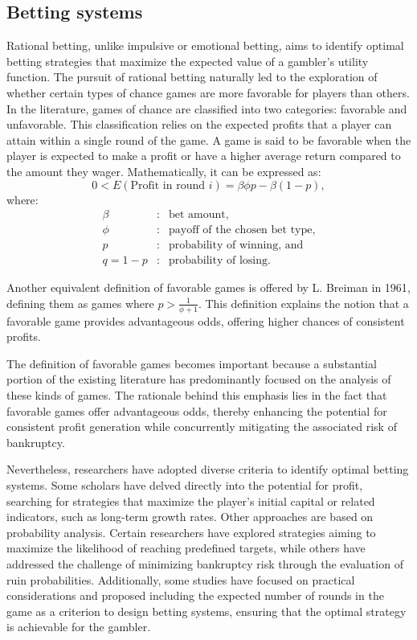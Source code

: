 \documentclass[11pt,twoside]{article}
\numberwithin{Theorem}{section}
\numberwithin{Definition}{section}
\numberwithin{Lemma}{section}
\numberwithin{Algorithm}{section}
\numberwithin{equation}{section}
\begin{document}
\subsection{Betting systems}
Rational betting, unlike impulsive or emotional betting, aims to identify optimal betting strategies that maximize the expected value of a gambler's utility function. The pursuit of rational betting naturally led to the exploration of whether certain types of chance games are more favorable for players than others. In the literature, games of chance are classified into two categories: favorable and unfavorable. This classification relies on the expected profits that a player can attain within a single round of the game. A game is said to be favorable when the player is expected to make a profit or have a higher average return compared to the amount they wager\cite{Dubins}. Mathematically, it can be expressed as:
\begin{equation}
0 < E(\text{Profit in round }i) = \beta\phi p -\beta(1-p),
\end{equation}\label{expectation_1}
where:
\begin{eqnarray*}
    \beta&:& \text{bet amount,}\\
    \phi&:& \text{payoff of the chosen bet type,}\\
    p&:& \text{probability of winning, and}\\
    q = 1-p &:&  \text{probability of losing}.
\end{eqnarray*}

Another equivalent definition of favorable games is offered by L. Breiman in 1961\cite{Breiman_1961}, defining them as games where $p > \frac{1}{\phi + 1}$. This definition explains the notion that a favorable game provides advantageous odds, offering higher chances of consistent profits.

The definition of favorable games becomes important because a substantial portion of the existing literature has predominantly focused on the analysis of these kinds of games\cite{Kelly, Breiman_1961, Dubins, Ethier_1982, Finkelstein_1981, Smith}. The rationale behind this emphasis lies in the fact that favorable games offer advantageous odds, thereby enhancing the potential for consistent profit generation while concurrently mitigating the associated risk of bankruptcy.

Nevertheless, researchers have adopted diverse criteria to identify optimal betting systems. Some scholars have delved directly into the potential for profit, searching for strategies that maximize the player's initial capital\cite{Thorp} or related indicators, such as long-term growth rates\cite{Kelly}. Other approaches are based on probability analysis. Certain researchers have explored strategies aiming to maximize the likelihood of reaching predefined targets\cite{Breiman_1961, Dubins, Ross_1974}, while others have addressed the challenge of minimizing bankruptcy risk through the evaluation of ruin probabilities\cite{Thorp}. Additionally, some studies have focused on practical considerations and proposed including the expected number of rounds in the game as a criterion to design betting systems\cite{Breiman_1961}, ensuring that the optimal strategy is achievable for the gambler.
\end{document}

